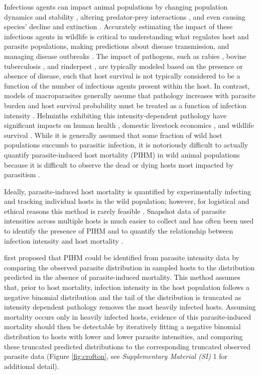 \documentclass[12pt, a4paper]{article}
\begin{document}
Infectious agents can impact animal populations by changing
population dynamics and stability \citep{Dobson1992,Tompkins2002}, altering predator-prey interactions \citep{Joly2004}, and
even causing species' decline and extinction \citep{DeCastro2005a,McCallum2012b}. Accurately estimating the impact
of these infectious agents in wildlife is critical to understanding what
regulates host and parasite populations, making predictions about disease
transmission, and managing disease outbreaks \citep{Langwig2015}. The impact of pathogens, such as rabies \citep{Coyne1989}, bovine tuberculosis \citep{Cox2005}, and
rinderpest \citep{Tille1991}, are typically modeled based on the presence or absence of disease, such that host survival is not typically considered to be a function of the number of infectious agents present within the host.  In contrast, models of macroparasites generally assume that pathology increases with parasite burden and host survival probability must be treated as a function of infection intensity \citep{AndersonandMay1978}. Helminths exhibiting this intensity-dependent pathology have significant impacts on human health \citep{Brooker2004}, domestic livestock economics \citep{Roeber2013}, and wildlife survival \citep{Kirk2003,Logiudice2003}. While it is generally assumed that some fraction of wild host populations succumb to parasitic infection, it is notoriously difficult to actually quantify parasite-induced host mortality (PIHM) in wild animal populations because it is difficult to observe the dead or dying hosts most impacted by parasitism \citep{McCallum2000a}.

Ideally, parasite-induced host mortality is
quantified by experimentally infecting and tracking individual hosts in the
wild population; however, for logistical and ethical reasons this method is
rarely feasible \citep{McCallum2000a}. Snapshot data of parasite intensities across multiple hosts is much easier to collect and has
often been used to identify the presence of PIHM \citep{Crofton1971a,Lester1977,Lester1984,Lanciani1989,Royce1990,Ferguson2011} and to quantify the
relationship between infection intensity and host mortality \citep{Adjei1986}.

\cite{Crofton1971a} first proposed that PIHM could be identified from parasite intensity data by comparing the
observed parasite distribution in sampled hosts to the distribution
predicted in the absence of parasite-induced mortality. This method
assumes that, prior to host mortality, infection intensity in the host population follows a negative binomial distribution and the tail of the distribution is truncated as intensity dependent pathology removes the most heavily infected hosts. Assuming mortality occurs only in heavily infected hosts, evidence of this parasite-induced mortality should then be detectable by iteratively
fitting a negative binomial distribution to hosts with lower and lower parasite intensities, and comparing these truncated predicted distributions to the corresponding truncated observed parasite data (Figure \ref{fig:crofton}, see \emph{Supplementary Material (SI)} 1 for additional detail).
\end{document}
